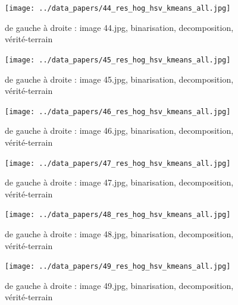 \documentclass{book}
\begin{document}
\begin{figure}[H]
\begin{center}
\texttt{[image: ../data\_papers/44\_res\_hog\_hsv\_kmeans\_all.jpg]}
\end{center}
\caption{de gauche à droite : image 44.jpg, binarisation, decomposition, vérité-terrain}
\label{44}
\end{figure}
\clearpage


\begin{figure}[H]
\begin{center}
\texttt{[image: ../data\_papers/45\_res\_hog\_hsv\_kmeans\_all.jpg]}
\end{center}
\caption{de gauche à droite : image 45.jpg, binarisation, decomposition, vérité-terrain}
\label{45}
\end{figure}
\clearpage


\begin{figure}[H]
\begin{center}
\texttt{[image: ../data\_papers/46\_res\_hog\_hsv\_kmeans\_all.jpg]}
\end{center}
\caption{de gauche à droite : image 46.jpg, binarisation, decomposition, vérité-terrain}
\label{46}
\end{figure}
\clearpage


\begin{figure}[H]
\begin{center}
\texttt{[image: ../data\_papers/47\_res\_hog\_hsv\_kmeans\_all.jpg]}
\end{center}
\caption{de gauche à droite : image 47.jpg, binarisation, decomposition, vérité-terrain}
\label{47}
\end{figure}
\clearpage


\begin{figure}[H]
\begin{center}
\texttt{[image: ../data\_papers/48\_res\_hog\_hsv\_kmeans\_all.jpg]}
\end{center}
\caption{de gauche à droite : image 48.jpg, binarisation, decomposition, vérité-terrain}
\label{48}
\end{figure}
\clearpage


\begin{figure}[H]
\begin{center}
\texttt{[image: ../data\_papers/49\_res\_hog\_hsv\_kmeans\_all.jpg]}
\end{center}
\caption{de gauche à droite : image 49.jpg, binarisation, decomposition, vérité-terrain}
\label{49}
\end{figure}
\clearpage
\end{document}
